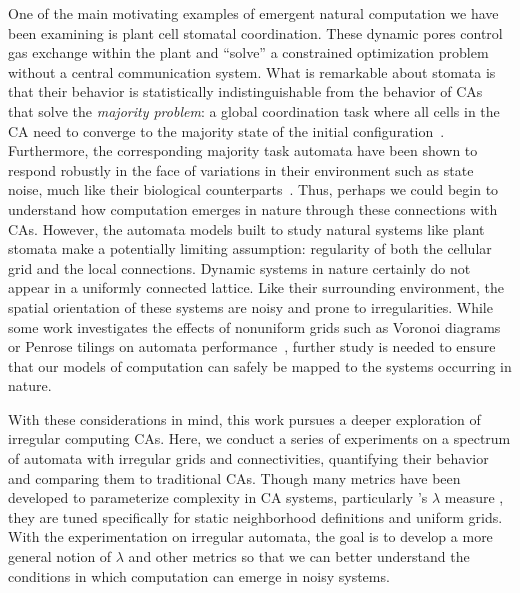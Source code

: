 \documentclass[a4paper,11pt]{article}
\begin{document}
One of the main motivating examples of emergent natural computation we have been examining is plant cell stomatal coordination. These dynamic pores control gas exchange within the plant and ``solve'' a constrained optimization problem without a central communication system. What is remarkable about stomata is that their behavior is statistically indistinguishable from the behavior of CAs that solve the \textit{majority problem}: a global coordination task where all cells in the CA need to converge to the majority state of the initial  configuration~\cite{mo07,pe04, we11}. Furthermore, the corresponding majority task automata have been shown to respond robustly in the face of variations in their environment such as state noise, much like their biological counterparts~\cite{me07}.
Thus, perhaps we could begin to understand how computation emerges in nature through these connections with CAs. However, the automata models built to study natural systems like plant stomata make a potentially limiting assumption: regularity of both the cellular grid and the local connections. Dynamic systems in nature certainly do not appear in a uniformly connected lattice. Like their surrounding environment, the spatial orientation of these systems are noisy and prone to irregularities. While some work investigates the effects of nonuniform grids such as Voronoi diagrams or Penrose tilings on automata performance~\cite{ca06,fl01,hi05}, further study is needed to ensure that our models of computation can safely be mapped to the systems occurring in nature.

With these considerations in mind, this work pursues a deeper exploration of irregular computing CAs. Here, we conduct a series of experiments on a spectrum of automata with irregular grids and connectivities, quantifying their behavior and comparing them to traditional CAs. Though many metrics have been developed to parameterize complexity in CA systems, particularly \citeauthor{la90}'s $\lambda$ measure \cite{la90}, they are tuned specifically for static neighborhood definitions and uniform grids. With the experimentation on irregular automata, the goal is to develop a more general notion of $\lambda$ and other metrics so that we can better understand the conditions in which computation can emerge in noisy systems.

\end{document}
